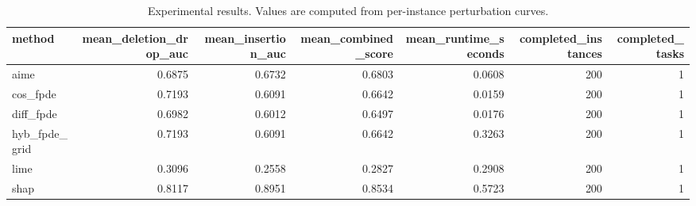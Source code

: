 \begin{table}[t]
\caption{Experimental results. Values are computed from per-instance perturbation curves.}
\label{tab:main_results_computed}
\centering
\begin{tabular}{lrrrrrr}
\toprule
method & mean\_deletion\_drop\_auc & mean\_insertion\_auc & mean\_combined\_score & mean\_runtime\_seconds & completed\_instances & completed\_tasks \\
\midrule
aime & 0.6875 & 0.6732 & 0.6803 & 0.0608 & 200 & 1 \\
cos\_fpde & 0.7193 & 0.6091 & 0.6642 & 0.0159 & 200 & 1 \\
diff\_fpde & 0.6982 & 0.6012 & 0.6497 & 0.0176 & 200 & 1 \\
hyb\_fpde\_grid & 0.7193 & 0.6091 & 0.6642 & 0.3263 & 200 & 1 \\
lime & 0.3096 & 0.2558 & 0.2827 & 0.2908 & 200 & 1 \\
shap & 0.8117 & 0.8951 & 0.8534 & 0.5723 & 200 & 1 \\
\bottomrule
\end{tabular}

\end{table}
